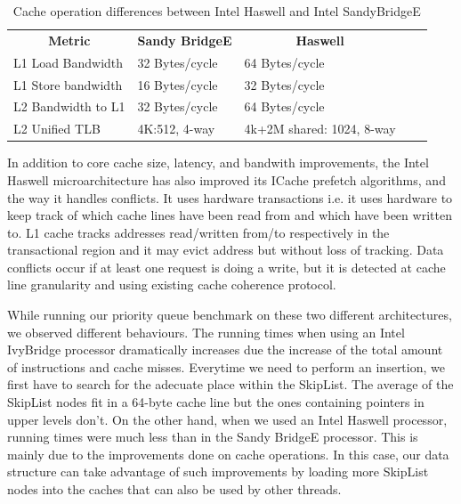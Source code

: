 \begin{table}[ht]
\footnotesize
\begin{tabular}{|l|l|l|ll}
\cline{1-3}
\multicolumn{1}{|c|}{\textbf{Metric}} & \multicolumn{1}{c|}{\textbf{Sandy BridgeE}} & \multicolumn{1}{c|}{\textbf{Haswell}} &  &  \\ \cline{1-3}
L1 Load Bandwidth                     & 32 Bytes/cycle                           & 64 Bytes/cycle                        &  &  \\ \cline{1-3}
L1 Store bandwidth                    & 16 Bytes/cycle                           & 32 Bytes/cycle                        &  &  \\ \cline{1-3}
L2 Bandwidth to L1                    & 32 Bytes/cycle                           & 64 Bytes/cycle                        &  &  \\ \cline{1-3}
L2 Unified TLB                        & 4K:512, 4-way                            & 4k+2M shared: 1024, 8-way             &  &  \\ \cline{1-3}
\end{tabular}
\caption{Cache operation differences between Intel Haswell and Intel SandyBridgeE}
\label{tab:haswell_ivy}
\end{table}

In addition to core cache size, latency, and bandwith improvements, the Intel Haswell microarchitecture has also improved its ICache prefetch algorithms, and the way it handles conflicts. It uses hardware transactions i.e. it uses hardware to keep track of which cache lines have been read from and which have been written to. L1 cache tracks addresses read/written from/to respectively in the transactional region and it may evict address but without loss of tracking. Data conflicts occur if at least one request is doing a write, but it is detected at cache line granularity and using existing cache coherence protocol.

While running our priority queue benchmark on these two different architectures, we observed different behaviours. The running times when using an Intel IvyBridge processor dramatically increases due the increase of the total amount of instructions and cache misses. Everytime we need to perform an insertion, we first have to search for the adecuate place within the SkipList. The average of the SkipList nodes fit in a 64-byte cache line but the ones containing pointers in upper levels don't. On the other hand, when we used an Intel Haswell processor, running times were much less than in the Sandy BridgeE processor. This is mainly due to the improvements done on cache operations. In this case, our data structure can take advantage of such improvements by loading more SkipList nodes into the caches that can also be used by other threads.

